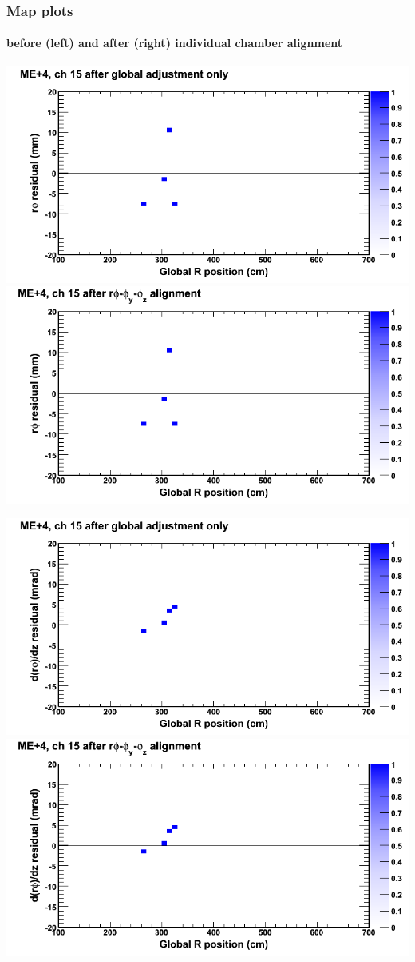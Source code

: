 \documentclass[compress]{beamer}
\begin{document}
\begin{frame}
\frametitle{Map plots}
\framesubtitle{before (left) and after (right) individual chamber alignment}
\includegraphics[width=0.5\linewidth]{ringmapplots_3dof/before_CSCvsr_mep4ch15_x.png} \includegraphics[width=0.5\linewidth]{ringmapplots_3dof/after_CSCvsr_mep4ch15_x.png}

\includegraphics[width=0.5\linewidth]{ringmapplots_3dof/before_CSCvsr_mep4ch15_dxdz.png} \includegraphics[width=0.5\linewidth]{ringmapplots_3dof/after_CSCvsr_mep4ch15_dxdz.png}
\end{frame}
\end{document}
